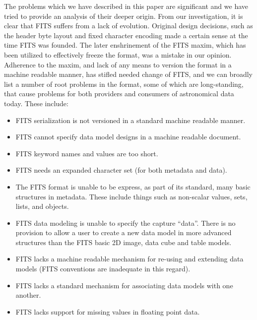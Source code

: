 \documentclass[final,authoryear,5p,times,twocolumn]{elsarticle}
\begin{document}
{{The problems which we have described in this paper are significant
and we have tried to provide an analysis of their deeper origin.
From our investigation, it is clear that FITS suffers from a lack of 
evolution. Original design decisions, such as the header byte layout
and fixed character encoding made a certain sense at the time FITS 
was founded. The later enshrinement of the FITS maxim, which has
been utilized to effectively freeze the format, was a mistake in our 
opinion.  Adherence to the maxim, and lack of any means to version
the format in a machine readable manner, has stifled needed change of
FITS, and we can broadly list a number of root problems in the format, 
some of which are long-standing, that cause problems for both providers
and consumers of astronomical data today.  These include:

\begin{itemize}

\item FITS serialization is not versioned in a standard machine readable manner. 

\item FITS cannot specify data model designs in a machine readable document.

\item FITS keyword names and values are too short.

\item FITS needs an expanded character set (for both metadata and data).

\item The FITS format is unable to be express, as part of its standard,
many basic structures in metadata. These include things such as non-scalar
values, sets, lists, and objects.

\item FITS data modeling is unable to specify the capture ``data''.
There is no provision to allow a user to create a new data model in more 
advanced structures than the FITS basic 2D image, data cube and table models.

\item FITS lacks a machine readable mechanism for re-using and extending data models 
(FITS conventions are inadequate in this regard). 

\item FITS lacks a standard mechanism for associating data models with one another.

\item FITS lacks support for missing values in floating point data.


\end{itemize}}}
\end{document}
